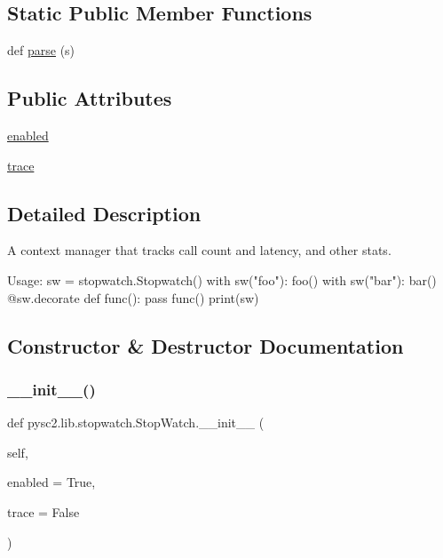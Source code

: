 \subsection*{Static Public Member Functions}
\begin{DoxyCompactItemize}
\item 
def \mbox{\hyperlink{classpysc2_1_1lib_1_1stopwatch_1_1_stop_watch_a74d4c6108011d2d25c32d24f6aeaf47d}{parse}} (s)
\end{DoxyCompactItemize}
\subsection*{Public Attributes}
\begin{DoxyCompactItemize}
\item 
\mbox{\hyperlink{classpysc2_1_1lib_1_1stopwatch_1_1_stop_watch_a7ef71d8389c2f81c3194986f4343736e}{enabled}}
\item 
\mbox{\hyperlink{classpysc2_1_1lib_1_1stopwatch_1_1_stop_watch_a953ca11fe39ca3fb2d7a8c9b5cab0695}{trace}}
\end{DoxyCompactItemize}


\subsection{Detailed Description}
\begin{DoxyVerb}A context manager that tracks call count and latency, and other stats.

Usage:
    sw = stopwatch.Stopwatch()
    with sw("foo"):
      foo()
    with sw("bar"):
      bar()
    @sw.decorate
    def func():
      pass
    func()
    print(sw)
\end{DoxyVerb}
 

\subsection{Constructor \& Destructor Documentation}
\mbox{\label{classpysc2_1_1lib_1_1stopwatch_1_1_stop_watch_ac8f219c810684d77e8d2d94f5e7aa271}} 
\subsubsection{\texorpdfstring{\+\_\+\+\_\+init\+\_\+\+\_\+()}{\_\_init\_\_()}}
{\footnotesize\ttfamily def pysc2.\+lib.\+stopwatch.\+Stop\+Watch.\+\_\+\+\_\+init\+\_\+\+\_\+ (\begin{DoxyParamCaption}\item[{}]{self,  }\item[{}]{enabled = {\ttfamily True},  }\item[{}]{trace = {\ttfamily False} }\end{DoxyParamCaption})}



